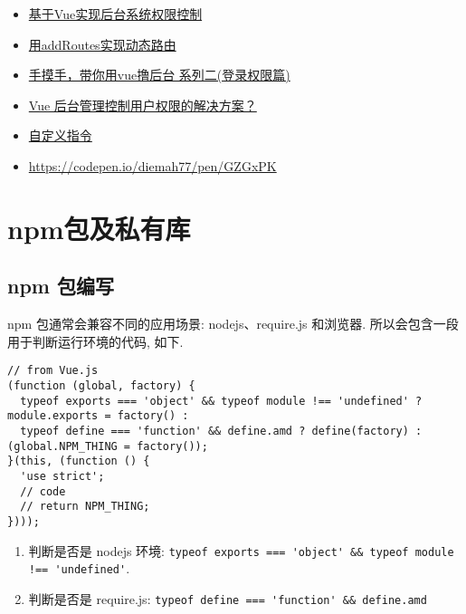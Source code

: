 \begin{itemize}
\tightlist
\item
  \href{http://refined-x.com/2017/08/29/\%E5\%9F\%BA\%E4\%BA\%8EVue\%E5\%AE\%9E\%E7\%8E\%B0\%E5\%90\%8E\%E5\%8F\%B0\%E7\%B3\%BB\%E7\%BB\%9F\%E6\%9D\%83\%E9\%99\%90\%E6\%8E\%A7\%E5\%88\%B6/}{基于Vue实现后台系统权限控制}
\item
  \href{http://refined-x.com/2017/09/01/\%E7\%94\%A8addRoutes\%E5\%AE\%9E\%E7\%8E\%B0\%E5\%8A\%A8\%E6\%80\%81\%E8\%B7\%AF\%E7\%94\%B1/}{用addRoutes实现动态路由}
\item
  \href{https://juejin.im/post/591aa14f570c35006961acac}{手摸手，带你用vue撸后台
  系列二(登录权限篇)}
\item
  \href{https://www.zhihu.com/question/58991978}{Vue
  后台管理控制用户权限的解决方案？}
\item
  \href{https://cn.vuejs.org/v2/guide/custom-directive.html}{自定义指令}
\item
  \url{https://codepen.io/diemah77/pen/GZGxPK}
\end{itemize}

\section{npm包及私有库}\label{npmux5305ux53caux79c1ux6709ux5e93}

\subsection{npm 包编写}\label{npm-ux5305ux7f16ux5199}

npm 包通常会兼容不同的应用场景: nodejs、require.js 和浏览器.
所以会包含一段用于判断运行环境的代码, 如下.

\begin{lstlisting}
// from Vue.js
(function (global, factory) {
  typeof exports === 'object' && typeof module !== 'undefined' ? module.exports = factory() :
  typeof define === 'function' && define.amd ? define(factory) : (global.NPM_THING = factory());
}(this, (function () {
  'use strict';
  // code
  // return NPM_THING;
})));
\end{lstlisting}

\begin{enumerate}
\def\labelenumi{\arabic{enumi}.}
\tightlist
\item
  判断是否是 nodejs 环境:
  \lstinline"typeof exports === 'object' && typeof module !== 'undefined'".
\item
  判断是否是 require.js:
  \lstinline!typeof define === 'function' && define.amd!
\end{enumerate}

